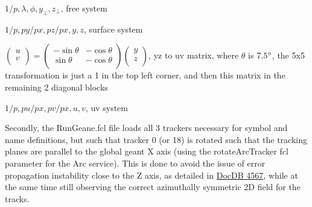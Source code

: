 $1/p, \lambda, \phi, y_{\perp}, z_{\perp}$, free system

$1/p, py/px, pz/px, y, z$, surface system

$
\begin{pmatrix}
u \\
v \\
\end{pmatrix} =
\begin{pmatrix}
-\sin{\theta} & -\cos{\theta} \\
\sin{\theta} & -\cos{\theta} \\
\end{pmatrix}
\begin{pmatrix}
y \\
z \\
\end{pmatrix}
$, yz to uv matrix, where $\theta$ is $7.5\degree$, the 5x5 transformation is just a 1 in the top left corner, and then this matrix in the remaining 2 diagonal blocks

$1/p, pu/px, pv/px, u, v$, uv system




Secondly, the RunGeane.fcl file loads all 3 trackers necessary for symbol and name definitions, but such that tracker 0 (or 18) is rotated such that the tracking planes are parallel to the global geant X axis (using the rotateArcTracker fcl parameter for the Arc service). This is done to avoid the issue of error propagation instability close to the Z axis, as detailed in \href{http://gm2-docdb.fnal.gov:8080/cgi-bin/ShowDocument?docid=4567}{DocDB 4567}, while at the same time still observing the correct azimuthally symmetric 2D field for the tracks.
